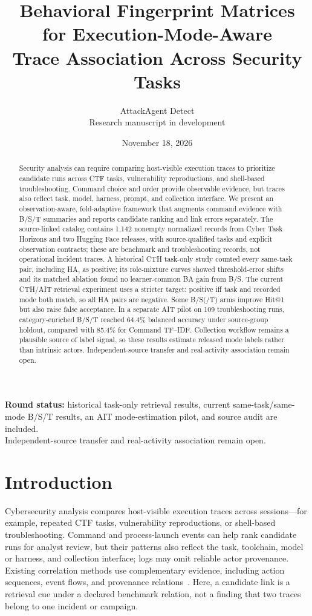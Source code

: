 \documentclass[10pt]{article}
\title{Behavioral Fingerprint Matrices for Execution-Mode-Aware\\Trace Association Across Security Tasks}
\author{AttackAgent Detect\\Research manuscript in development}
\date{November 18, 2026}
\begin{document}
\maketitle
\begin{center}
\small\textbf{Round status:} historical task-only retrieval results, current same-task/same-mode B/S/T results, an AIT mode-estimation pilot, and source audit are included.\\
Independent-source transfer and real-activity association remain open.
\end{center}

\begin{abstract}
Security analysis can require comparing host-visible execution traces to prioritize candidate runs across CTF tasks, vulnerability reproductions, and shell-based troubleshooting. Command choice and order provide observable evidence, but traces also reflect task, model, harness, prompt, and collection interface. We present an observation-aware, fold-adaptive framework that augments command evidence with B/S/T summaries and reports candidate ranking and link errors separately. The source-linked catalog contains 1,142 nonempty normalized records from Cyber Task Horizons and two Hugging Face releases, with source-qualified tasks and explicit observation contracts; these are benchmark and troubleshooting records, not operational incident traces. A historical CTH task-only study counted every same-task pair, including HA, as positive; its role-mixture curves showed threshold-error shifts and its matched ablation found no learner-common BA gain from B/S. The current CTH/AIT retrieval experiment uses a stricter target: positive iff task and recorded mode both match, so all HA pairs are negative. Some B/S(/T) arms improve Hit@1 but also raise false acceptance. In a separate AIT pilot on 109 troubleshooting runs, category-enriched B/S/T reached 64.4\% balanced accuracy under source-group holdout, compared with 85.4\% for Command TF--IDF. Collection workflow remains a plausible source of label signal, so these results estimate released mode labels rather than intrinsic actors. Independent-source transfer and real-activity association remain open.
\end{abstract}

\section{Introduction}
Cybersecurity analysis compares host-visible execution traces across sessions—for example, repeated CTF tasks, vulnerability reproductions, or shell-based troubleshooting. Command and process-launch events can help rank candidate runs for analyst review, but their patterns also reflect the task, toolchain, model or harness, and collection interface; logs may omit reliable actor provenance. Existing correlation methods use complementary evidence, including action sequences, event flows, and provenance relations~\cite{atlas,holmes,poirot,ostinato}. Here, a candidate link is a retrieval cue under a declared benchmark relation, not a finding that two traces belong to one incident or campaign.
\end{document}
